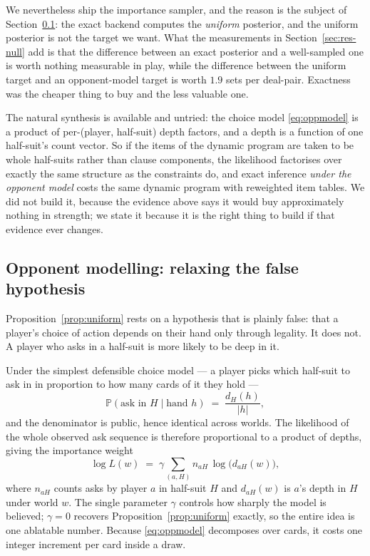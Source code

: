 \documentclass[11pt,letterpaper]{article}
\newcommand{\halfsuit}{\ensuremath{H}}
\newcommand{\Prob}{\ensuremath{\mathbb{P}}}
\begin{document}
We nevertheless ship the importance sampler, and the reason is the subject of
Section~\ref{sec:oppmodel}: the exact backend computes the \emph{uniform}
posterior, and the uniform posterior is not the target we want. What the
measurements in Section~\ref{sec:res-null} add is that the difference between an
exact posterior and a well-sampled one is worth nothing measurable in play,
while the difference between the uniform target and an opponent-model target is
worth $1.9$ sets per deal-pair. Exactness was the cheaper thing to buy and the
less valuable one.

The natural synthesis is available and untried: the choice model
\eqref{eq:oppmodel} is a product of per-(player, half-suit) depth factors, and a
depth is a function of one half-suit's count vector. So if the items of the
dynamic program are taken to be whole half-suits rather than clause components,
the likelihood factorises over exactly the same structure as the constraints do,
and exact inference \emph{under the opponent model} costs the same dynamic
program with reweighted item tables. We did not build it, because the evidence
above says it would buy approximately nothing in strength; we state it because
it is the right thing to build if that evidence ever changes.

\subsection{Opponent modelling: relaxing the false hypothesis}
\label{sec:oppmodel}

Proposition~\ref{prop:uniform} rests on a hypothesis that is plainly false:
that a player's choice of action depends on their hand only through legality.
It does not. A player who asks in a half-suit is more likely to be deep in it.

Under the simplest defensible choice model --- a player picks which half-suit
to ask in in proportion to how many cards of it they hold ---
\begin{equation}
\Prob(\text{ask in } \halfsuit \mid \text{hand } h)
\;=\; \frac{d_\halfsuit(h)}{|h|},
\label{eq:choice}
\end{equation}
and the denominator is public, hence identical across worlds. The likelihood of
the whole observed ask sequence is therefore proportional to a product of
depths, giving the importance weight
\begin{equation}
\log L(w) \;=\; \gamma \sum_{(a,\halfsuit)} n_{a\halfsuit} \,
\log\big( d_{a\halfsuit}(w) \big),
\label{eq:oppmodel}
\end{equation}
where $n_{a\halfsuit}$ counts asks by player $a$ in half-suit $\halfsuit$ and
$d_{a\halfsuit}(w)$ is $a$'s depth in $\halfsuit$ under world $w$. The single
parameter $\gamma$ controls how sharply the model is believed;
$\gamma = 0$ recovers Proposition~\ref{prop:uniform} exactly, so the entire
idea is one ablatable number. Because \eqref{eq:oppmodel} decomposes over
cards, it costs one integer increment per card inside a draw.
\end{document}
